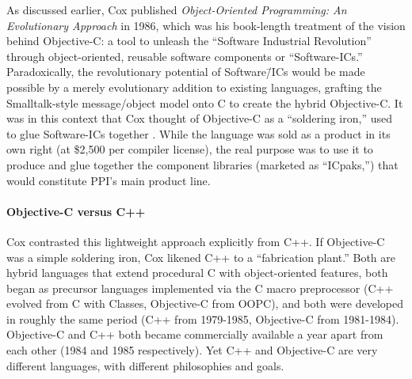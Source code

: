 \documentclass[acmsmall,screen]{acmart}
\begin{document}
As discussed earlier, Cox published \emph{Object-Oriented Programming: An Evolutionary Approach} in 1986, which was his book-length treatment of the vision behind Objective-C: a tool to unleash the ``Software Industrial Revolution'' through object-oriented, reusable software components or ``Software-ICs.''  \citep{cox_object-oriented_1986} Paradoxically, the revolutionary potential of Software\=/ICs would be made possible by a merely evolutionary addition to existing languages, grafting the Smalltalk-style message/object model onto C to create the hybrid Objective-C. It was in this context that Cox thought of Objective-C as a ``soldering iron,'' used to glue Software-ICs together \citep[260]{biancuzzi_objective-c_2009}. While the language was sold as a product in its own right (at \$2,500 per compiler license), the real purpose was to use it to produce and glue together the component libraries (marketed as ``ICpaks,'') that would constitute PPI's main product line.
\paragraph{Objective-C versus C++}
\label{subsec-ObjCvC++}
Cox contrasted this lightweight approach explicitly from C++. If Objective-C was a simple soldering iron, Cox likened C++ to a ``fabrication plant.'' \citetext{\citealp[29--30]{cox_oral_2016}, \citealp[263]{biancuzzi_objective-c_2009}}  Both are hybrid languages that extend procedural C with object-oriented features, both began as precursor languages implemented via the C macro preprocessor (C++ evolved from C with Classes, Objective-C from OOPC), and both were developed in roughly the same period (C++ from 1979-1985, Objective-C from 1981-1984). Objective-C and C++ both became commercially available a year apart from each other (1984 and 1985 respectively). Yet C++ and Objective-C are very different languages, with different philosophies and goals. 
\end{document}
